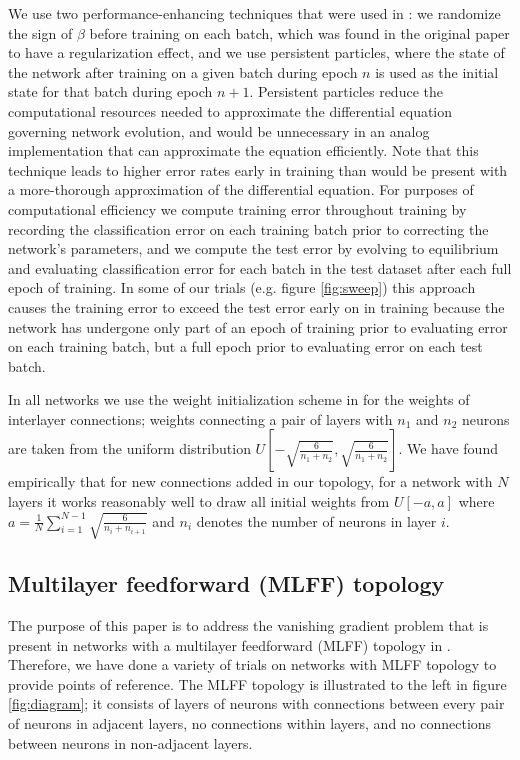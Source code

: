 \documentclass[utf8]{frontiersSCNS}
\begin{document}
We use two performance-enhancing techniques that were used in \citep{scellier17}: we randomize the sign of $\beta$ before training on each batch, which was found in the original paper to have a regularization effect, and we use persistent particles, where the state of the network after training on a given batch during epoch $n$ is used as the initial state for that batch during epoch $n+1$. Persistent particles reduce the computational resources needed to approximate the differential equation governing network evolution, and would be unnecessary in an analog implementation that can approximate the equation efficiently. Note that this technique leads to higher error rates early in training than would be present with a more-thorough approximation of the differential equation. For purposes of computational efficiency we compute training error throughout training by recording the classification error on each training batch prior to correcting the network's parameters, and we compute the test error by evolving to equilibrium and evaluating classification error for each batch in the test dataset after each full epoch of training. In some of our trials (e.g. figure \ref{fig:sweep}) this approach causes the training error to exceed the test error early on in training because the network has undergone only part of an epoch of training prior to evaluating error on each training batch, but a full epoch prior to evaluating error on each test batch.

In all networks we use the weight initialization scheme in \citep{glorot2010} for the weights of interlayer connections; weights connecting a pair of layers with $n_1$ and $n_2$ neurons are taken from the uniform distribution $U[-\sqrt{\frac{6}{n_1+n_2}}, \sqrt{\frac{6}{n_1+n_2}}]$. We have found empirically that for new connections added in our topology, for a network with $N$ layers it works reasonably well to draw all initial weights from $U[-a,a]$ where $a=\frac{1}{N}\sum_{i=1}^{N-1}\sqrt{\frac{6}{n_i+n_{i+1}}}$ and $n_i$ denotes the number of neurons in layer $i$.

\subsection{Multilayer feedforward (MLFF) topology}\label{sec:mlff_top}

The purpose of this paper is to address the vanishing gradient problem that is present in networks with a multilayer feedforward (MLFF) topology in \citep{scellier17}. Therefore, we have done a variety of trials on networks with MLFF topology to provide points of reference. The MLFF topology is illustrated to the left in figure \ref{fig:diagram}; it consists of layers of neurons with connections between every pair of neurons in adjacent layers, no connections within layers, and no connections between neurons in non-adjacent layers.
\end{document}
